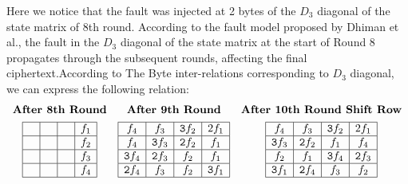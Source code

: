 Here we notice that the fault was injected at 2 bytes of the $D_3$ diagonal of the state matrix of 8th round. According to the fault model proposed by Dhiman et al.,\cite{Saha2009ADF} the fault in the $D_3$ diagonal of the state matrix at the start of Round 8 propagates through the subsequent rounds, affecting the final ciphertext.According to The Byte inter-relations corresponding to $D_3$ diagonal, we can express the following relation:
\[
\begin{array}{ccc}
    \textbf{After 8th Round} & \textbf{After 9th Round} & \textbf{After 10th Round Shift Row} \\[1ex]
    \begin{array}{|c|c|c|c|}
        \hline
        \texttt{ } & \texttt{ } &  \texttt{ } & \texttt{$f_1$}\\
        \hline
        \texttt{ } & \texttt{ } &  \texttt{ } & \texttt{$f_2$}  \\
        \hline
        \texttt{ } & \texttt{ } &  \texttt{ } & \texttt{$f_3$}  \\
        \hline
        \texttt{ } & \texttt{ } &  \texttt{ } & \texttt{$f_4$} \\
        \hline
    \end{array}
&

\begin{array}{|c|c|c|c|}
    \hline
    \texttt{$f_4$} & \texttt{$f_3$} & \texttt{3$f_2$} & \texttt{$2f_1$} \\
    \hline
    \texttt{$f_4$} & \texttt{3$f_3$} & \texttt{2$f_2$} & \texttt{$f_1$} \\
    \hline
    \texttt{3$f_4$} & \texttt{2$f_3$} & \texttt{$f_2$} & \texttt{$f_1$} \\
    \hline
    \texttt{2$f_4$} & \texttt{$f_3$} & \texttt{$f_2$} & \texttt{3$f_1$} \\
    \hline
\end{array}

    &

    \begin{array}{|c|c|c|c|}
        \hline
        \texttt{$f_4$} & \texttt{$f_3$} & \texttt{3$f_2$} & \texttt{$2f_1$} \\
        \hline
        \texttt{3$f_3$} & \texttt{2$f_2$} & \texttt{$f_1$} & \texttt{$f_4$} \\
        \hline
        \texttt{$f_2$} & \texttt{$f_1$} & \texttt{3$f_4$} & \texttt{2$f_3$} \\
        \hline
        \texttt{3$f_1$} & \texttt{2$f_4$} & \texttt{$f_3$} & \texttt{$f_2$}\\
        \hline
    \end{array}
    
\end{array}
\]

